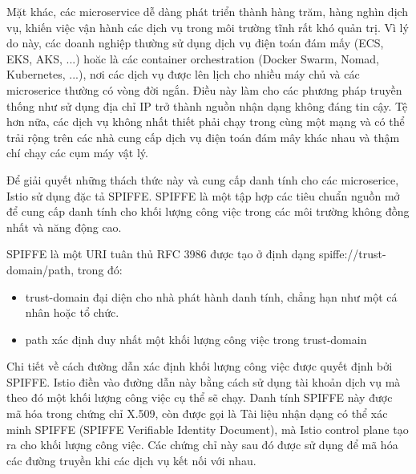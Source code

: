 \documentclass[12pt,a4paper]{report}
\begin{document}
{{			Mặt khác, các microservice dễ dàng phát triển thành hàng trăm, hàng nghìn dịch vụ, khiến việc vận hành các dịch vụ trong môi trường tĩnh rất khó quản trị. Vì lý do này, các doanh nghiệp thường sử dụng dịch vụ điện toán đám mấy (ECS, EKS, AKS, ...) hoăc là các container orchestration (Docker Swarm, Nomad, Kubernetes, ...), nơi các dịch vụ được lên lịch cho nhiều máy chủ và các microserice thường có vòng đời ngắn. Điều này làm cho các phương pháp truyền thống như sử dụng địa chỉ IP trở thành nguồn nhận dạng không đáng tin cậy. Tệ hơn nữa, các dịch vụ không nhất thiết phải chạy trong cùng một mạng và có thể trải rộng trên các nhà cung cấp dịch vụ điện toán đám mây khác nhau và thậm chí chạy các cụm máy vật lý.
			
			Để giải quyết những thách thức này và cung cấp danh tính cho các microserice, Istio sử dụng đặc tả SPIFFE. SPIFFE là một tập hợp các tiêu chuẩn nguồn mở để cung cấp danh tính cho khối lượng công việc trong các môi trường không đồng nhất và năng động cao.
			
			SPIFFE là một URI tuân thủ RFC 3986 được tạo ở định dạng spiffe://trust-domain/path, trong đó:
			\begin{itemize}
				\item trust-domain đại diện cho nhà phát hành danh tính, chẳng hạn như một cá nhân hoặc tổ chức.
				\item path xác định duy nhất một khối lượng công việc trong trust-domain
			\end{itemize}
		
			Chi tiết về cách đường dẫn xác định khối lượng công việc được quyết định bởi SPIFFE. Istio điền vào đường dẫn này bằng cách sử dụng tài khoản dịch vụ mà theo đó một khối lượng công việc cụ thể sẽ chạy. Danh tính SPIFFE này được mã hóa trong chứng chỉ X.509, còn được gọi là Tài liệu nhận dạng có thể xác minh SPIFFE (SPIFFE Verifiable Identity Document), mà Istio control plane tạo ra cho khối lượng công việc. Các chứng chỉ này sau đó được sử dụng để mã hóa các đường truyền khi các dịch vụ kết nối với nhau.
		
}}
\end{document}
